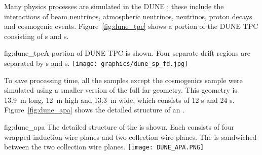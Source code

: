 


Many physics processes are simulated in the DUNE ; these include the interactions of beam neutrinos, atmospheric neutrinos,  neutrinos, proton decays and cosmogenic events. Figure~\ref{fig:dune_tpc} shows a portion of the DUNE \single TPC consisting of s and s.

\begin{dunefigure}{fig:dune_tpc}{A portion of DUNE \single TPC is shown. Four separate drift regions are separated by s and s.}
\texttt{[image: graphics/dune\_sp\_fd.jpg]}
\end{dunefigure}

To save processing time, all the  samples except the cosmogenics sample were simulated using a smaller version of the full \nominalmodsize far  geometry. This geometry is \SI{13.9}{m} long, \SI{12}{m} high and \SI{13.3}{m} wide, which consists of 12 s and 24 s. %
Figure~\ref{fig:dune_apa} shows the detailed structure of an . %
\begin{dunefigure}
{fig:dune_apa}
{The detailed structure of the  is shown. Each  consists of four wrapped induction wire planes and two collection wire planes.
The  is sandwiched between the two collection wire planes.}
\texttt{[image: DUNE\_APA.PNG]}
\end{dunefigure}


